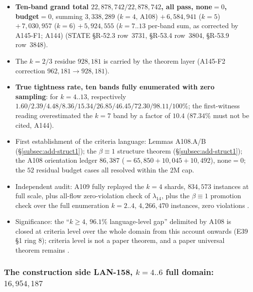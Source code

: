 \begin{itemize}
\item \textbf{Ten-band grand total $22{,}878{,}742/22{,}878{,}742$, all pass,
none$=0$, budget$=0$}, summing $3{,}338{,}289$ ($k=4$, A108)
$+\,6{,}584{,}941$ ($k=5$) $+\,7{,}030{,}957$ ($k=6$)
$+\,5{,}924{,}555$ ($k=7..13$ per-band sum, as corrected by A145-F1; A144)
(STATE \S R-52.3 row~3731, \S R-53.4 row~3804, \S R-53.9 row~3848).
\item The $k=2/3$ residue $928{,}181$ is carried by the theorem layer
(A145-F2 correction $962{,}181\to928{,}181$).
\item \textbf{True tightness rate, ten bands fully enumerated with zero
sampling}: for $k=4..13$, respectively
$1.60/2.39/4.48/8.36/15.34/26.85/46.45/72.30/98.11/100\%$; the first-witness
reading overestimated the $k=7$ band by a factor of $10.4$ ($87.34\%$ must
not be cited, A144).
\item First establishment of the criteria language: Lemmas A108.A/B
(\S\ref{subsec:add-struct1}); the $\beta\equiv1$ structure theorem
(\S\ref{subsec:add-struct1}); the A108 orientation ledger $86{,}387$
($=65{,}850+10{,}045+10{,}492$), none$=0$; the $52$ residual budget cases all
resolved within the $2$M cap.
\item Independent audit: A109 fully replayed the $k=4$ shards, $834{,}573$
instances at full scale, plus all-flow zero-violation check of
$\lambda_{14}$, plus the $\beta\equiv1$ promotion check over the full
enumeration $k=2..4$, $4{,}266{,}470$ instances, zero violations
.
\item Significance: the ``$k\ge4$, $96.1\%$ language-level gap'' delimited by
A108 is closed at criteria level over the whole domain from this account
onwards (E39 \S1 ring 8); criteria level is not a paper theorem, and a paper
universal theorem remains \openlab.
\end{itemize}

\subsubsection{The construction side LAN-158, $k=4..6$ full domain:
$16{,}954{,}187$ \tierMCA}\label{subsubsec:add-lan158}

